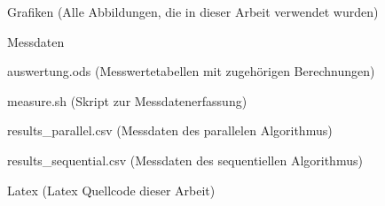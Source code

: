 \begin{deepitemize}
\begin{deepitemize}
\item Grafiken (Alle Abbildungen, die in dieser Arbeit verwendet wurden)
\item Messdaten
\begin{deepitemize}
\item auswertung.ods (Messwertetabellen mit zugehörigen Berechnungen)
\item measure.sh (Skript zur Messdatenerfassung)
\item results\_parallel.csv (Messdaten des parallelen Algorithmus)
\item results\_sequential.csv (Messdaten des sequentiellen Algorithmus)
\end{deepitemize}

\item Latex (Latex Quellcode dieser Arbeit)

\end{deepitemize}
\end{deepitemize}